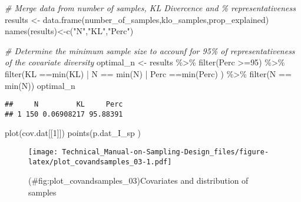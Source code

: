 \documentclass[
]{book}
\newenvironment{Shaded}{\begin{snugshade}}{\end{snugshade}}
\newcommand{\CommentTok}[1]{\textcolor[rgb]{0.56,0.35,0.01}{\textit{#1}}}
\newcommand{\DecValTok}[1]{\textcolor[rgb]{0.00,0.00,0.81}{#1}}
\newcommand{\FunctionTok}[1]{\textcolor[rgb]{0.00,0.00,0.00}{#1}}
\newcommand{\NormalTok}[1]{#1}
\newcommand{\OtherTok}[1]{\textcolor[rgb]{0.56,0.35,0.01}{#1}}
\newcommand{\SpecialCharTok}[1]{\textcolor[rgb]{0.00,0.00,0.00}{#1}}
\newcommand{\StringTok}[1]{\textcolor[rgb]{0.31,0.60,0.02}{#1}}
\begin{document}
\begin{Shaded}
\begin{Highlighting}[]
  \CommentTok{\# Merge data from number of samples, KL Divercence and \% representativeness }
\NormalTok{  results }\OtherTok{\textless{}{-}} \FunctionTok{data.frame}\NormalTok{(number\_of\_samples,klo\_samples,prop\_explained)}
  \FunctionTok{names}\NormalTok{(results)}\OtherTok{\textless{}{-}}\FunctionTok{c}\NormalTok{(}\StringTok{"N"}\NormalTok{,}\StringTok{"KL"}\NormalTok{,}\StringTok{"Perc"}\NormalTok{)}
  
  \CommentTok{\# Determine the minimum sample size to accounf for 95\% of representativeness of the covariate diversity}
\NormalTok{  optimal\_n }\OtherTok{\textless{}{-}}\NormalTok{ results }\SpecialCharTok{\%\textgreater{}\%}
    \FunctionTok{filter}\NormalTok{(Perc }\SpecialCharTok{\textgreater{}=}\DecValTok{95}\NormalTok{) }\SpecialCharTok{\%\textgreater{}\%} 
    \FunctionTok{filter}\NormalTok{(KL }\SpecialCharTok{==}\FunctionTok{min}\NormalTok{(KL) }\SpecialCharTok{|}\NormalTok{ N }\SpecialCharTok{==} \FunctionTok{min}\NormalTok{(N) }\SpecialCharTok{|}\NormalTok{ Perc }\SpecialCharTok{==}\FunctionTok{min}\NormalTok{(Perc) ) }\SpecialCharTok{\%\textgreater{}\%} 
    \FunctionTok{filter}\NormalTok{(N }\SpecialCharTok{==} \FunctionTok{min}\NormalTok{(N))}
\NormalTok{  optimal\_n}
\end{Highlighting}
\end{Shaded}

\begin{verbatim}
##     N         KL     Perc
## 1 150 0.06908217 95.88391
\end{verbatim}

\begin{Shaded}
\begin{Highlighting}[]
  \FunctionTok{plot}\NormalTok{(cov.dat[[}\DecValTok{1}\NormalTok{]])}
  \FunctionTok{points}\NormalTok{(p.dat\_I\_sp )}
\end{Highlighting}
\end{Shaded}

\begin{figure}
\centering
\texttt{[image: Technical\_Manual-on-Sampling-Design\_files/figure-latex/plot\_covandsamples\_03-1.pdf]}
\caption{(\#fig:plot\_covandsamples\_03)Covariates and distribution of samples}
\end{figure}
\end{document}

